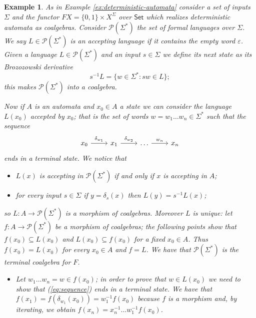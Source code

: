 \documentclass[letterpaper, 11pt, oneside]{memoir}
\theoremstyle{myteo}
\newtheorem{example}[theorem]{Example}
\numberwithin{equation}{section}
\newcommand{\Set}{\textsf{Set}}
\begin{document}
\begin{example}
  As in Example \ref{ex:deterministic-automata} consider a set of inputs \(\Sigma\) and the functor \(FX = \{0, 1\} \times X^\Sigma\) over \(\Set\) which realizes deterministic automata as coalgebras.
  Consider \(\mathcal{P}(\Sigma^*)\) the set of formal languages over \(\Sigma\).
  We say \(L\in \mathcal{P}(\Sigma^*)\) is an accepting language if it contains the empty word \(\varepsilon\).
  Given a language \(L \in \mathcal{P}(\Sigma^*)\) and an input \(s \in \Sigma\) we define its next state as its Brozozowski derivative
  \begin{equation*}
    s^{-1}L = \{w \in \Sigma^* : sw \in L\};
  \end{equation*}
  this makes \(\mathcal{P}(\Sigma^*)\) into a coalgebra.

  Now if \(A\) is an automata and \(x_0 \in A\) a state we can consider the language \(L(x_0)\) accepted by \(x_0\); that is the set of words \(w = w_1\ldots w_n \in \Sigma^*\) such that the sequence
  \begin{equation}
    \label{eq:sequence}
    \begin{tikzcd}[sep=normal]
      x_0 \ar[r, "\delta_{w_1}"] & x_1 \ar[r, "\delta_{w_2}"] & \ldots \ar[r, "w_{n}"] & x_n
    \end{tikzcd}
  \end{equation}
  ends in a terminal state.
  We notice that
  \begin{itemize}
  \item[1.] \(L(x)\) is accepting in \(\mathcal{P}(\Sigma^*)\) if and only if \(x\) is accepting in \(A\);
  \item[2.] for every input \(s \in \Sigma\) if \(y = \delta_s(x)\) then \(L(y) = s^{-1}L(x)\);
  \end{itemize}
  so \(L: A \to \mathcal{P}(\Sigma^*)\) is a morphism of coalgebras. Moreover \(L\) is unique: let \(f: A \to \mathcal{P}(\Sigma^*)\) be a morphism of coalgebras; the following points show that \(f(x_0) \subseteq L(x_0)\) and \(L(x_0) \subseteq f(x_0)\) for a fixed \(x_0 \in A\). Thus \(f(x_0) = L(x_0)\) for every \(x_0 \in A\) and \(f = L\).
  We have that \(\mathcal{P}(\Sigma^*)\) is the terminal coalgebra for \(F\).
  \begin{itemize}
  \item[a.] Let \(w_1\ldots w_n = w \in f(x_0)\); in order to prove that \(w \in L(x_0)\) we need to show that (\ref{eq:sequence}) ends in a terminal state.
    We have that \(f(x_1) = f(\delta_{w_1}(x_0)) = w_1^{-1}f(x_0)\) because \(f\) is a morphism and, by iterating, we obtain \(f(x_n) = x_n^{-1}\ldots w_1^{-1}f(x_0)\).

\end{itemize}
\end{example}
\end{document}
